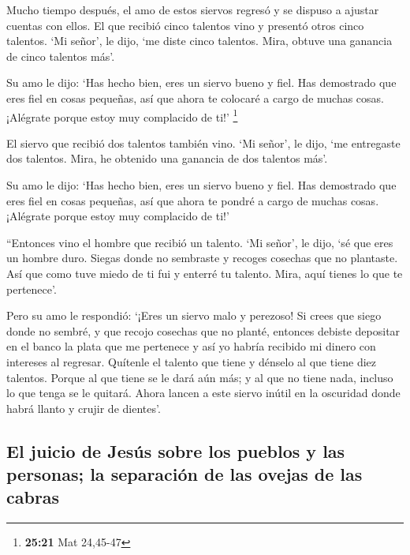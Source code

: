  Mucho tiempo después, el amo de estos siervos regresó y
se dispuso a ajustar cuentas con ellos.  El que recibió
cinco talentos vino y presentó otros cinco talentos. `Mi señor', le
dijo, `me diste cinco talentos. Mira, obtuve una ganancia de cinco
talentos más'.

 Su amo le dijo: `Has hecho bien, eres un siervo bueno y
fiel. Has demostrado que eres fiel en cosas pequeñas, así que ahora te
colocaré a cargo de muchas cosas. ¡Alégrate porque estoy muy complacido
de ti!' \footnote{\textbf{25:21} Mat 24,45-47}

 El siervo que recibió dos talentos también vino. `Mi
señor', le dijo, `me entregaste dos talentos. Mira, he obtenido una
ganancia de dos talentos más'.

 Su amo le dijo: `Has hecho bien, eres un siervo bueno y
fiel. Has demostrado que eres fiel en cosas pequeñas, así que ahora te
pondré a cargo de muchas cosas. ¡Alégrate porque estoy muy complacido de
ti!'

 ``Entonces vino el hombre que recibió un talento. `Mi
señor', le dijo, `sé que eres un hombre duro. Siegas donde no sembraste
y recoges cosechas que no plantaste.  Así que como tuve
miedo de ti fui y enterré tu talento. Mira, aquí tienes lo que te
pertenece'.

 Pero su amo le respondió: `¡Eres un siervo malo y
perezoso! Si crees que siego donde no sembré, y que recojo cosechas que
no planté,  entonces debiste depositar en el banco la
plata que me pertenece y así yo habría recibido mi dinero con intereses
al regresar.  Quítenle el talento que tiene y dénselo al
que tiene diez talentos.  Porque al que tiene se le dará
aún más; y al que no tiene nada, incluso lo que tenga se le quitará.
 Ahora lancen a este siervo inútil en la oscuridad donde
habrá llanto y crujir de dientes'.

\hypertarget{el-juicio-de-jesuxfas-sobre-los-pueblos-y-las-personas-la-separaciuxf3n-de-las-ovejas-de-las-cabras}{%
\subsection{El juicio de Jesús sobre los pueblos y las personas; la
separación de las ovejas de las
cabras}\label{el-juicio-de-jesuxfas-sobre-los-pueblos-y-las-personas-la-separaciuxf3n-de-las-ovejas-de-las-cabras}}

